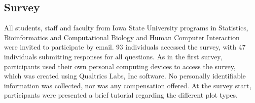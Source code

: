 
% 




\subsection*{Survey }\label{app2}
All students, staff and faculty from Iowa State University programs in Statistics, Bioinformatics and Computational Biology and Human Computer Interaction were invited to participate by email. 93 individuals accessed the survey, with 47 individuals submitting responses for all questions. As in the first survey, participants used their own personal computing devices to access the survey, which was created using Qualtrics Labs, Inc software. No personally identifiable information was collected, nor was any compensation offered. At the survey start, participants were presented a brief tutorial regarding the different plot types.  \\

